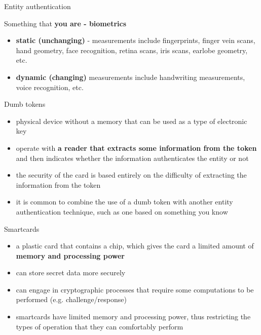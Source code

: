 \documentclass[pdf]{beamer}
\begin{document}
\begin{frame}{Entity authentication}

Something that \textbf{you are - biometrics}

\begin{itemize}
\item
\textbf{static (unchanging)} - measurements include fingerprints, finger vein scans, hand geometry, face recognition, retina scans, iris scans, earlobe geometry, etc.
\newline

\item
\textbf{dynamic (changing)} measurements include handwriting measurements, voice recognition, etc.
\end{itemize}
\end{frame}



\begin{frame}{Dumb tokens}
\begin{itemize}
\item
physical device without a memory that can be used as a type of electronic key

\item
operate with \textbf{a reader that extracts some information from the token} and then indicates whether the information authenticates the entity or not

\item
the security of the card is based entirely on the difficulty of extracting the information from the token

\item
it is common to combine the use of a dumb token with another entity authentication technique, such as one based on something you know

\end{itemize}
\end{frame}



\begin{frame}{Smartcards}
\begin{itemize}
\item
a plastic card that contains a chip, which gives the card a limited amount of \textbf{memory and processing power}

\item
can store secret data more securely

\item
can engage in cryptographic processes that require some computations to be performed (e.g. challenge/response)

\item
smartcards have limited memory and processing power, thus restricting the types of operation that they can comfortably perform

\end{itemize}
\end{frame}
\end{document}
